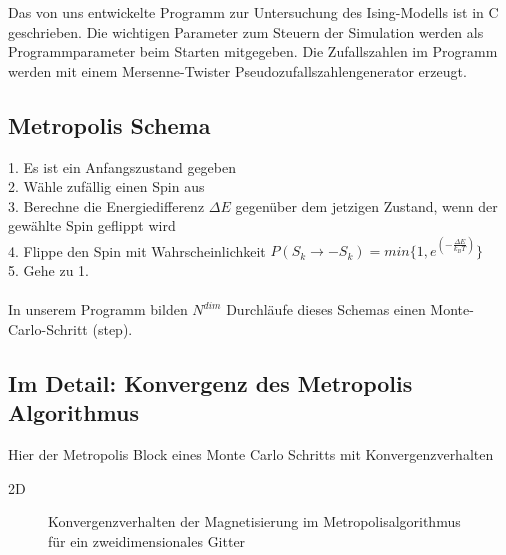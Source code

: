 Das von uns entwickelte Programm zur Untersuchung des Ising-Modells ist in C geschrieben. Die wichtigen Parameter zum Steuern der Simulation werden als Programmparameter beim Starten mitgegeben. Die Zufallszahlen im Programm werden mit einem Mersenne-Twister Pseudozufallszahlengenerator erzeugt.

\subsection{Metropolis Schema}

1. Es ist ein Anfangszustand gegeben\\
2. Wähle zufällig einen Spin aus\\
3. Berechne die Energiedifferenz $\Delta E$ gegenüber dem jetzigen Zustand, wenn der gewählte Spin geflippt wird\\
4. Flippe den Spin mit Wahrscheinlichkeit $P(S_k \rightarrow -S_k)=min\{ 1, e^{(-\frac{\Delta E}{k_B T})} \}$\\
5. Gehe zu 1.\\\\
In unserem Programm bilden $N^{dim}$ Durchläufe dieses Schemas einen Monte-Carlo-Schritt (step).

\subsection{Im Detail: Konvergenz des Metropolis Algorithmus}

Hier der Metropolis Block eines Monte Carlo Schritts mit Konvergenzverhalten

2D

\begin{figure}[H]
	\centering
	\caption{Konvergenzverhalten der Magnetisierung im Metropolisalgorithmus für ein zweidimensionales Gitter}
	\label{mp2dkonv}
\end{figure}


